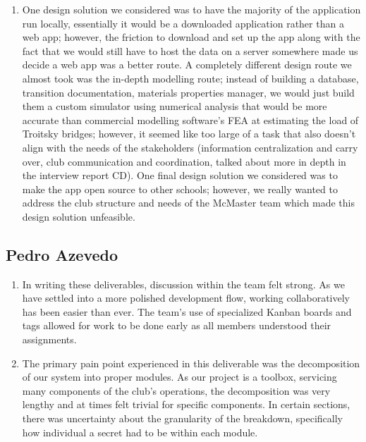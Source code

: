 \documentclass[12pt, titlepage]{article}
\begin{document}
\begin{enumerate}
  \item One design solution we considered was to have the majority of the application run locally, essentially it would be a downloaded application rather than a web app; however, the friction to download and set up the app along with the fact that we would still have to host the data on a server somewhere made us decide a web app was a better route.
  A completely different design route we almost took was the in-depth modelling route; instead of building a database, transition documentation, materials properties manager, we would just build them a custom simulator using numerical analysis that would be more accurate than commercial modelling software's FEA at estimating the load of Troitsky bridges; however, it seemed like too large of a task that also doesn't align with the needs of the stakeholders (information centralization and carry over, club communication and coordination, talked about more in depth in the interview report CD).
  One final design solution we considered was to make the app open source to other schools; however, we really wanted to address the club structure and needs of the McMaster team which made this design solution unfeasible.

\end{enumerate}

\subsection{Pedro Azevedo}
\begin{enumerate}
  \item In writing these deliverables, discussion within the team felt strong. As we have settled into a more polished development flow, working collaboratively has been easier than ever. The team's use of specialized Kanban boards and tags allowed for work to be done early as all members understood their assignments.
  \item The primary pain point experienced in this deliverable was the decomposition of our system into proper modules. As our project is a toolbox, servicing many components of the club's operations, the decomposition was very lengthy and at times felt trivial for specific components.
  In certain sections, there was uncertainty about the granularity of the breakdown, specifically how individual a secret had to be within each module. 
\end{enumerate}
\end{document}
